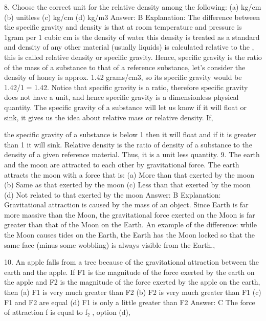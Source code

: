 8. Choose the correct unit for the relative density among the
following:
(a) kg/cm
(b) unitless
(c) kg/cm
(d) kg/m3
Answer: B
Explanation: The difference between the specific gravity and
density is that at room temperature and pressure is 1gram per 1
cubic cm is the density of water this density is treated as a
standard and density of any other material (usually liquids) is
calculated relative to the , this is called relative density or specific
gravity.
Hence, specific gravity is the ratio of the mass of a substance to
that of a reference substance, let’s consider the density of honey is
approx. 1.42 grams/cm3, so its specific gravity would be 1.42/1 =
1.42. Notice that specific gravity is a ratio, therefore specific
gravity does not have a unit, and hence specific gravity is a
dimensionless physical quantity.
The specific gravity of a substance will let us know if it will float or
sink, it gives us the idea about relative mass or relative density. If, 


the specific gravity of a substance is below 1 then it will float and if
it is greater than 1 it will sink.
Relative density is the ratio of density of a substance to
the density of a given reference material. Thus, it is a unit less
quantity.
9. The earth and the moon are attracted to each other by
gravitational force. The earth attracts the moon with a force
that is:
(a) More than that exerted by the moon
(b) Same as that exerted by the moon
(c) Less than that exerted by the moon
(d) Not related to that exerted by the moon
Answer: B
Explanation: Gravitational attraction is caused by the mass of an
object. Since Earth is far more massive than the Moon, the
gravitational force exerted on the Moon is far greater than that of
the Moon on the Earth. An example of the difference: while the
Moon causes tides on the Earth, the Earth has the Moon locked so
that the same face (minus some wobbling) is always visible from the
Earth., 


10. An apple falls from a tree because of the gravitational
attraction between the earth and the apple. If F1 is the
magnitude of the force exerted by the earth on the apple and
F2 is the magnitude of the force exerted by the apple on the
earth, then
(a) F1 is very much greater than F2
(b) F2 is very much greater than F1
(c) F1 and F2 are equal
(d) F1 is only a little greater than F2
Answer: C
The force of attraction f is equal to f₂ , option (d), 




